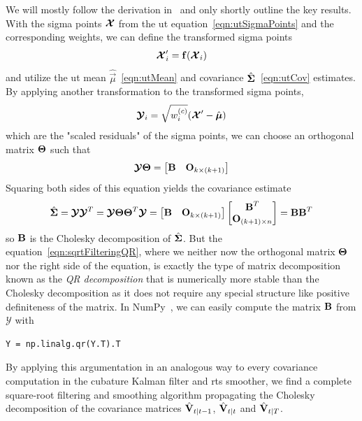 		We will mostly follow the derivation in~\cite{ruttenSquarerootUnscentedFiltering2013} and only shortly outline the key results. With the sigma points \( \boldsymbol{\mathrm{\mathcal{X}}} \) from the \ac{ut} equation~\eqref{eqn:utSigmaPoints} and the corresponding weights, we can define the transformed sigma points
		\begin{equation*}
			\boldsymbol{\mathrm{\mathcal{X}}}_i' = \boldsymbol{\mathrm{f}}(\boldsymbol{\mathrm{\mathcal{X}}}_i)
		\end{equation*}
		and utilize the \ac{ut} mean \( \hat{\vec{\mu}} \)~\eqref{eqn:utMean} and covariance \( \hat{\boldsymbol{\mathrm{\Sigma}}} \)~\eqref{eqn:utCov} estimates. By applying another transformation to the transformed sigma points,
		\begin{equation*}
			\boldsymbol{\mathrm{\mathcal{Y}}}_i = \sqrt{w_i^{(c)}} (\boldsymbol{\mathrm{\mathcal{X}}}' - \hat{\boldsymbol{\mathrm{\mu}}})
		\end{equation*}
		which are the "scaled residuals" of the sigma points, we can choose an orthogonal matrix \( \boldsymbol{\mathrm{\Theta}} \) such that
		\begin{equation}
			\boldsymbol{\mathrm{\mathcal{Y}}} \boldsymbol{\mathrm{\Theta}} = \begin{bmatrix} \boldsymbol{\mathrm{B}} & \boldsymbol{\mathrm{O}}_{k \times (k + 1)} \end{bmatrix}  \label{eqn:sqrtFilteringQR}
		\end{equation}
		Squaring both sides of this equation yields the covariance estimate
		\begin{equation*}
			\hat{\boldsymbol{\mathrm{\Sigma}}} = \boldsymbol{\mathrm{\mathcal{Y}}} \boldsymbol{\mathrm{\mathcal{Y}}}^T = \boldsymbol{\mathrm{\mathcal{Y}}} \boldsymbol{\mathrm{\Theta}} \boldsymbol{\mathrm{\Theta}}^T \boldsymbol{\mathrm{\mathcal{Y}}} = \begin{bmatrix} \boldsymbol{\mathrm{B}} & \boldsymbol{\mathrm{O}}_{k \times (k + 1)} \end{bmatrix} \begin{bmatrix} \boldsymbol{\mathrm{B}}^T \\ \boldsymbol{\mathrm{O}}_{(k + 1) \times n} \end{bmatrix} = \boldsymbol{\mathrm{B}} \boldsymbol{\mathrm{B}}^T
		\end{equation*}
		so \( \boldsymbol{\mathrm{B}} \) is the Cholesky decomposition of \( \hat{\boldsymbol{\mathrm{\Sigma}}} \). But the equation~\eqref{eqn:sqrtFilteringQR}, where we neither now the orthogonal matrix \( \boldsymbol{\mathrm{\Theta}} \) nor the right side of the equation, is exactly the type of matrix decomposition known as the \emph{QR decomposition} that is numerically more stable than the Cholesky decomposition as it does not require any special structure like positive definiteness of the matrix. In NumPy~\cite{harrisArrayProgrammingNumPy2020}, we can easily compute the matrix \( \boldsymbol{\mathrm{B}} \) from \( \mathbb{\mathcal{Y}} \) with
		\begin{lstlisting}
Y = np.linalg.qr(Y.T).T
		\end{lstlisting}
		By applying this argumentation in an analogous way to every covariance computation in the cubature Kalman filter and \ac{rts} smoother, we find a complete square-root filtering and smoothing algorithm propagating the Cholesky decomposition of the covariance matrices \( \hat{\boldsymbol{\mathrm{V}}}_{t \vert t - 1} \), \( \hat{\boldsymbol{\mathrm{V}}}_{t \vert t} \) and \( \hat{\boldsymbol{\mathrm{V}}}_{t \vert T} \).

